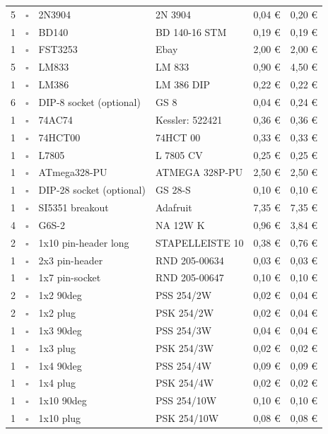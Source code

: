 \documentclass[10pt, a4paper,twoside]{scrartcl}
\begin{document}
\begin{longtable}{|p{}|p{}|p{}|p{}|p{}|p{}|}
5 & $\square$ & 2N3904 & 2N 3904 & 0,04 \euro & 0,20 \euro \\
1 & $\square$ & BD140 & BD 140-16 STM & 0,19 \euro & 0,19 \euro \\
1 & $\square$ & FST3253 & Ebay & 2,00 \euro & 2,00 \euro \\
5 & $\square$ & LM833 & LM 833 & 0,90 \euro & 4,50 \euro \\
1 & $\square$ & LM386 & LM 386 DIP & 0,22 \euro & 0,22 \euro \\
6 & $\square$ & DIP-8 socket (optional) & GS 8 & 0,04 \euro & 0,24 \euro \\
1 & $\square$ & 74AC74 & Kessler: 522421 & 0,36 \euro & 0,36 \euro \\
1 & $\square$ & 74HCT00 & 74HCT 00 & 0,33 \euro & 0,33 \euro \\
1 & $\square$ & L7805 & L 7805 CV & 0,25 \euro & 0,25 \euro \\
1 & $\square$ & ATmega328-PU & ATMEGA 328P-PU & 2,50 \euro & 2,50 \euro \\
1 & $\square$ & DIP-28 socket (optional) & GS 28-S & 0,10 \euro & 0,10 \euro \\
1 & $\square$ & SI5351 breakout & Adafruit & 7,35 \euro & 7,35 \euro \\ \hline
4 & $\square$ & G6S-2 & NA 12W K & 0,96 \euro & 3,84 \euro \\ \hline
2 & $\square$ & 1x10 pin-header long & STAPELLEISTE 10 & 0,38 \euro & 0,76 \euro \\
1 & $\square$ & 2x3 pin-header & RND 205-00634 & 0,03 \euro & 0,03 \euro \\
1 & $\square$ & 1x7 pin-socket & RND 205-00647 & 0,10 \euro & 0,10 \euro \\
2 & $\square$ & 1x2 90deg & PSS 254/2W & 0,02 \euro & 0,04 \euro \\
2 & $\square$ & 1x2 plug & PSK 254/2W & 0,02 \euro & 0,04 \euro \\
1 & $\square$ & 1x3 90deg & PSS 254/3W & 0,04 \euro & 0,04 \euro \\
1 & $\square$ & 1x3 plug & PSK 254/3W & 0,02 \euro & 0,02 \euro \\
1 & $\square$ & 1x4 90deg & PSS 254/4W & 0,09 \euro & 0,09 \euro \\
1 & $\square$ & 1x4 plug & PSK 254/4W & 0,02 \euro & 0,02 \euro \\
1 & $\square$ & 1x10 90deg & PSS 254/10W & 0,10 \euro & 0,10 \euro \\
1 & $\square$ & 1x10 plug & PSK 254/10W & 0,08 \euro & 0,08 \euro \\

\end{longtable}
\end{document}
